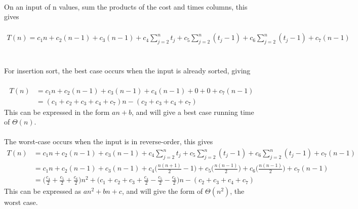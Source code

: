 \documentclass{article}
\begin{document}
\\
On an input of n values, sum the products of the cost and times columns, this gives
\\
\\
\begin{multline*}
T(n) = c_1n + c_2(n-1) + c_3(n-1) + c_4\sum_{j=2}^{n} t_j + c_5\sum_{j=2}^{n} (t_j-1) + c_6\sum_{j=2}^{n} (t_j-1) + c_7(n-1)
\end{multline*}
\\
\\
For insertion sort, the best case occurs when the input is already sorted, giving
\\
\\
\begin{equation*}
\begin{split}
T(n) & = c_1n + c_2(n-1) + c_3(n-1) + c_4(n-1) + 0 + 0 + c_7(n-1) \\
  & = (c_1 + c_2 + c_3 + c_4 + c_7)n - (c_2 + c_3 + c_4 + c_7)
\end{split}
\end{equation*}
This can be expressed in the form $an + b$, and will give a best case running time of $\Theta(n)$.
\\
\\
The worst-case occurs when the input is in reverse-order, this gives
\begin{equation*}
\begin{split}
T(n) & = c_1n + c_2(n-1) + c_3(n-1) + c_4\sum_{j=2}^{n} t_j + c_5\sum_{j=2}^{n} (t_j-1) + c_6\sum_{j=2}^{n} (t_j-1) + c_7(n-1) \\
  & = c_1n + c_2(n-1) + c_3(n-1) + c_4\bigg(\frac{n(n+1)}{2} - 1 \bigg) + c_5\bigg(\frac{n(n-1)}{2}\bigg) + c_6\bigg(\frac{n(n-1)}{2}\bigg) + c_7(n-1) \\
  & = \bigg(\frac{c_4}{2} + \frac{c_5}{2} + \frac{c_6}{2}\bigg)n^2 + \bigg(c_1 + c_2 + c_3 + \frac{c_4}{2} - \frac{c_5}{2} - \frac{c_6}{2}\bigg)n - (c_2 + c_3 + c_4 + c_7)
\end{split}
\end{equation*}
This can be expressed as $an^2 + bn + c$, and will give the form of $\Theta(n^2)$, the worst case.
\end{document}
